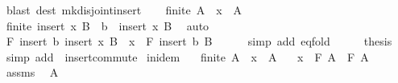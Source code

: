 \begin{isabellebody}
\ {\isacharparenleft}{\kern0pt}blast\ dest{\isacharcolon}{\kern0pt}\ mk{\isacharunderscore}{\kern0pt}disjoint{\isacharunderscore}{\kern0pt}insert{\isacharparenright}{\kern0pt}\isanewline
\ \ \isamarkupfalse%
\ {\isacartoucheopen}finite\ A{\isacartoucheclose}\ \ {\isacartoucheopen}x\ {\isasymnotin}\ A{\isacartoucheclose}\isanewline
\ \ \ \ \isamarkupfalse%
\ {\isachardoublequoteopen}finite\ {\isacharparenleft}{\kern0pt}insert\ x\ B{\isacharparenright}{\kern0pt}{\isachardoublequoteclose}\ \ {\isachardoublequoteopen}b\ {\isasymnotin}\ insert\ x\ B{\isachardoublequoteclose}\ \isamarkupfalse%
\ auto\isanewline
\ \ \isamarkupfalse%
\ \isamarkupfalse%
\ {\isachardoublequoteopen}F\ {\isacharparenleft}{\kern0pt}insert\ b\ {\isacharparenleft}{\kern0pt}insert\ x\ B{\isacharparenright}{\kern0pt}{\isacharparenright}{\kern0pt}\ {\isacharequal}{\kern0pt}\ x\ \isactrlbold {\isacharasterisk}{\kern0pt}\ F\ {\isacharparenleft}{\kern0pt}insert\ b\ B{\isacharparenright}{\kern0pt}{\isachardoublequoteclose}\isanewline
\ \ \ \ \isamarkupfalse%
\ {\isacharparenleft}{\kern0pt}simp\ add{\isacharcolon}{\kern0pt}\ eq{\isacharunderscore}{\kern0pt}fold{\isacharparenright}{\kern0pt}\isanewline
\ \ \isamarkupfalse%
\ \isamarkupfalse%
\ {\isacharquery}{\kern0pt}thesis\ \isamarkupfalse%
\ {\isacharparenleft}{\kern0pt}simp\ add{\isacharcolon}{\kern0pt}\ {\isacharasterisk}{\kern0pt}\ insert{\isacharunderscore}{\kern0pt}commute{\isacharparenright}{\kern0pt}\isanewline
{}\isamarkupfalse%
%
\endisatagproof
{\isafoldproof}%
%
\isadelimproof
\isanewline
%
\endisadelimproof
\isanewline
{}\isamarkupfalse%
\ in{\isacharunderscore}{\kern0pt}idem{\isacharcolon}{\kern0pt}\isanewline
\ \ \ {\isachardoublequoteopen}finite\ A{\isachardoublequoteclose}\ \ {\isachardoublequoteopen}x\ {\isasymin}\ A{\isachardoublequoteclose}\isanewline
\ \ \ {\isachardoublequoteopen}x\ \isactrlbold {\isacharasterisk}{\kern0pt}\ F\ A\ {\isacharequal}{\kern0pt}\ F\ A{\isachardoublequoteclose}\isanewline
%
\isadelimproof
%
\endisadelimproof
%
\isatagproof
{}\isamarkupfalse%
\ {\isacharminus}{\kern0pt}\isanewline
\ \ \isamarkupfalse%
\ assms\ \isamarkupfalse%
\ {\isachardoublequoteopen}A\ {\isasymnoteq}\ {\isacharbraceleft}{\kern0pt}{\isacharbraceright}{\kern0pt}{\isachardoublequoteclose}\ \isamarkupfalse%

\end{isabellebody}

